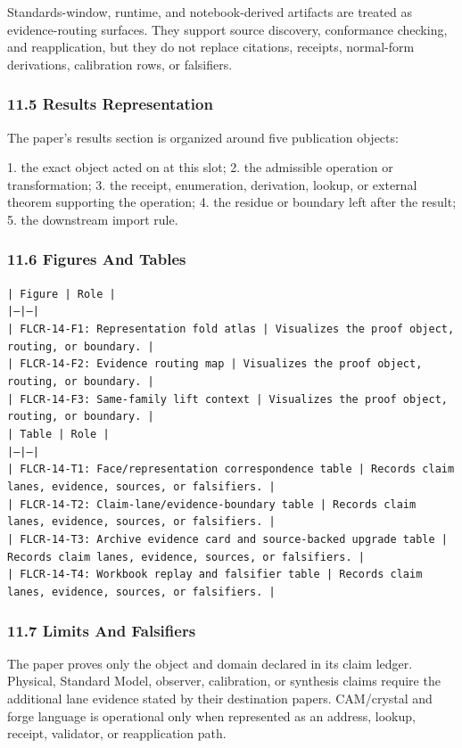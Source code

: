 \documentclass[11pt]{article}
\begin{document}
Standards-window, runtime, and notebook-derived artifacts are treated
as evidence-routing surfaces. They support source discovery, conformance
checking, and reapplication, but they do not replace citations, receipts,
normal-form derivations, calibration rows, or falsifiers.

\subsubsection*{11.5 Results Representation}

The paper's results section is organized around five publication objects:

1. the exact object acted on at this slot;
2. the admissible operation or transformation;
3. the receipt, enumeration, derivation, lookup, or external theorem supporting
   the operation;
4. the residue or boundary left after the result;
5. the downstream import rule.

\subsubsection*{11.6 Figures And Tables}

\noindent\texttt{| Figure | Role |}\\
\noindent\texttt{|---|---|}\\
\noindent\texttt{| FLCR-14-F1: Representation fold atlas | Visualizes the proof object, routing, or boundary. |}\\
\noindent\texttt{| FLCR-14-F2: Evidence routing map | Visualizes the proof object, routing, or boundary. |}\\
\noindent\texttt{| FLCR-14-F3: Same-family lift context | Visualizes the proof object, routing, or boundary. |}\\

\noindent\texttt{| Table | Role |}\\
\noindent\texttt{|---|---|}\\
\noindent\texttt{| FLCR-14-T1: Face/representation correspondence table | Records claim lanes, evidence, sources, or falsifiers. |}\\
\noindent\texttt{| FLCR-14-T2: Claim-lane/evidence-boundary table | Records claim lanes, evidence, sources, or falsifiers. |}\\
\noindent\texttt{| FLCR-14-T3: Archive evidence card and source-backed upgrade table | Records claim lanes, evidence, sources, or falsifiers. |}\\
\noindent\texttt{| FLCR-14-T4: Workbook replay and falsifier table | Records claim lanes, evidence, sources, or falsifiers. |}\\

\subsubsection*{11.7 Limits And Falsifiers}

The paper proves only the object and domain declared in its claim ledger.
Physical, Standard Model, observer, calibration, or synthesis claims require
the additional lane evidence stated by their destination papers. CAM/crystal
and forge language is operational only when represented as an address, lookup,
receipt, validator, or reapplication path.
\end{document}
